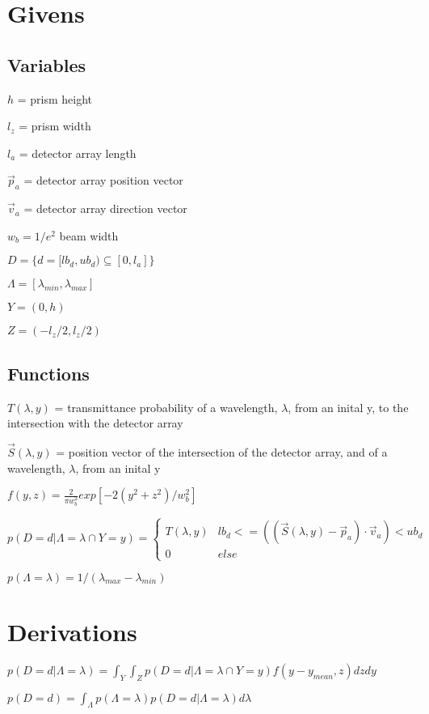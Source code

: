 \documentclass{article}
\begin{document}
\section{Givens}
\subsection{Variables}
$h$ = prism height

$l_z$  = prism width

$l_a$  = detector array length

$\vec{p}_a$ = detector array position vector

$\vec{v}_a$ = detector array direction vector

$w_b  =  1 / e^2$ {beam width}

$D  = \{ d = [lb_d, ub_d) \subseteq [0, l_a] \}$

$\Lambda  =  [\lambda_{min}, \lambda_{max}] $

$Y = (0, h) $

$Z = (-l_z / 2, l_z / 2)$

\subsection{Functions}
$T(\lambda, y)$ = transmittance probability of a wavelength, $\lambda$, from an inital y, to the intersection with the detector array

$\vec{S}(\lambda, y)$  = position vector of the intersection of the detector array, and of a wavelength, $\lambda$, from an inital y

$f(y, z) = \frac{2}{\pi  w_b^2}exp[-2(y^2 + z^2)/w_b^2]$

$$p(D=d|\Lambda=\lambda \cap Y=y) = \begin{cases}
T(\lambda, y) & lb_d <= ((\vec{S}(\lambda, y) - \vec{p}_a) \cdot \vec{v}_a) < ub_d \\
0 & else \end{cases}$$

$p(\Lambda=\lambda) = 1 / (\lambda_{max} - \lambda_{min})$



\section{Derivations}

$p(D=d|\Lambda=\lambda) = \int_Y\int_Z p(D=d|\Lambda=\lambda \cap Y=y)f(y - y_{mean}, z)dz dy$

$p(D=d) = \int_\Lambda p(\Lambda=\lambda) p(D=d|\Lambda=\lambda)d\lambda$
\end{document}
